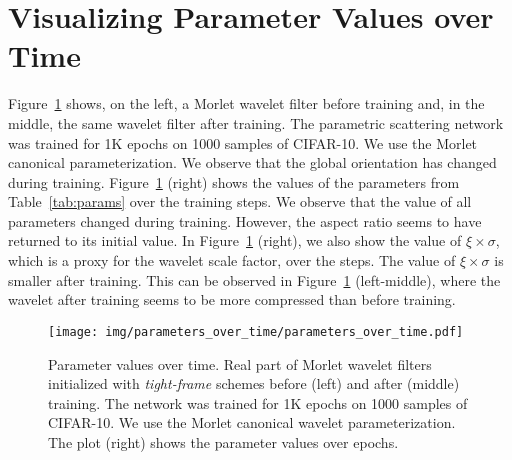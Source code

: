 \documentclass[10pt,twocolumn,letterpaper]{article}
\begin{document}
\clearpage
\section{Visualizing Parameter Values over Time}

 Figure~\ref{fig:params_over_time} shows, on the left, a Morlet wavelet filter before training and, in the middle, the same wavelet filter after training. The parametric scattering network was trained for 1K epochs on 1000 samples of CIFAR-10. We use the Morlet canonical parameterization. We observe that the global orientation has changed during training. Figure~\ref{fig:params_over_time} (right) shows the values of the parameters from Table~\ref{tab:params} over the training steps. We observe that the value of all parameters changed during training. However, the aspect ratio seems to have returned to its initial value. In Figure~\ref{fig:params_over_time} (right), we also show the value of $\xi \times \sigma$, which is a proxy for the wavelet scale factor, over the steps. The value of $\xi \times \sigma$ is smaller after training. This can be observed in Figure~\ref{fig:params_over_time} (left-middle), where the wavelet after training seems to be more compressed than before training.

\begin{figure}[H]
    \centering
    \texttt{[image: img/parameters\_over\_time/parameters\_over\_time.pdf]}
    \caption{Parameter values over time. Real part of Morlet wavelet filters initialized with \textit{tight-frame}  schemes before (left) and after (middle) training. The network was trained for 1K epochs on 1000 samples of CIFAR-10. We use the Morlet canonical wavelet parameterization. The plot (right) shows the parameter values over epochs. }
    \label{fig:params_over_time}
\end{figure}
\end{document}
